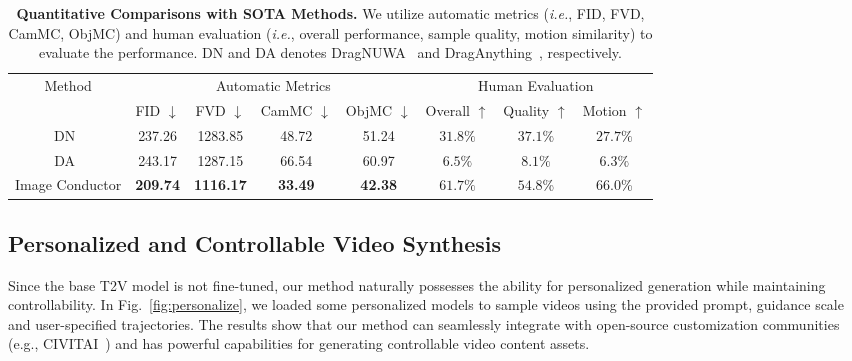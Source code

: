 \documentclass{article} %
\begin{document}
\begin{table}[t]
\caption{\textbf{Quantitative Comparisons with SOTA Methods.} We utilize automatic metrics (\textit{i.e.}, FID, FVD, CamMC, ObjMC) and human evaluation (\textit{i.e.}, overall performance, sample quality, motion similarity) to evaluate the performance. DN and DA denotes DragNUWA~\citep{wu2024draganything} and DragAnything~\citep{yin2023dragnuwa}, respectively.}
\vspace{-5pt}
\small
\centering
\begin{tabular}{c | c c c c|c c c }
\toprule
\multirow{2}{*}{Method} & \multicolumn{4}{c|}{Automatic Metrics} & \multicolumn{3}{c}{Human Evaluation}\\
 & FID $\downarrow$ & FVD $\downarrow$ & CamMC $\downarrow$ & ObjMC $\downarrow$ & Overall $\uparrow$ & Quality $\uparrow$ & Motion $\uparrow$\\
\hline
DN~\citep{yin2023dragnuwa} & 237.26 & 1283.85 & 48.72 & 51.24 & $31.8\%$ & $37.1\%$ & $27.7\%$\\
DA~\citep{wu2024draganything} & 243.17 & 1287.15 & 66.54 & 60.97 & $6.5\%$ & $8.1\%$ & $6.3\%$\\
Image Conductor & \textbf{209.74} & \textbf{1116.17} & \textbf{33.49} & \textbf{42.38} & $\mathbf{61.7\%}$ & $\mathbf{54.8}$\% & $\mathbf{66.0}$\% \\
\toprule
\end{tabular}
\label{tb_cp}
\vspace{-10pt}
\end{table}




\subsection{Personalized and Controllable Video Synthesis}
Since the base T2V model is not fine-tuned, our method naturally possesses the ability for personalized generation while maintaining controllability. In Fig.~\ref{fig:personalize}, we loaded some personalized models to sample videos using the provided prompt, guidance scale and user-specified trajectories. The results show that our method can seamlessly integrate with open-source customization communities (e.g., CIVITAI~\protect\footnotemark{}) and has powerful capabilities for generating controllable video content assets.

\end{document}
